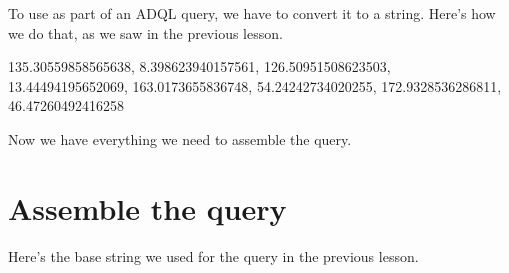 \documentclass[letterpaper,10pt,english]{sphinxmanual}
\begin{document}
To use  as part of an ADQL query, we have to convert it to a string.  Here’s how we do that, as we saw in the previous lesson.

\begin{sphinxVerbatim}[commandchars=\\\{\}]
  

  \PYG{p}{[}
        \PYG{p}{]}

  
\end{sphinxVerbatim}

\begin{sphinxVerbatim}[commandchars=\\\{\}]
\PYGZsq{}135.30559858565638, 8.398623940157561, 126.50951508623503, 13.44494195652069, 163.0173655836748, 54.24242734020255, 172.9328536286811, 46.47260492416258\PYGZsq{}
\end{sphinxVerbatim}

Now we have everything we need to assemble the query.


\section{Assemble the query}
\label{\detokenize{04_select:assemble-the-query}}
Here’s the base string we used for the query in the previous lesson.

\begin{sphinxVerbatim}[commandchars=\\\{\}]
  
\end{sphinxVerbatim}
\end{document}
